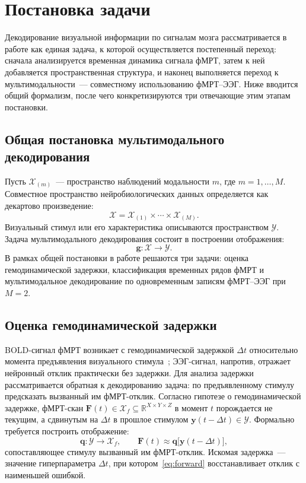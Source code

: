 \section{Постановка задачи}\label{sec2}

Декодирование визуальной информации по сигналам мозга рассматривается в работе как единая задача, к которой осуществляется постепенный переход: сначала анализируется временная динамика сигнала фМРТ, затем к ней добавляется пространственная структура, и наконец выполняется переход к мультимодальности~--- совместному использованию фМРТ--ЭЭГ. Ниже вводится общий формализм, после чего конкретизируются три отвечающие этим этапам постановки.

\subsection{Общая постановка мультимодального декодирования}\label{sec2:general}

Пусть $\mathcal{X}_{(m)}$~--- пространство наблюдений модальности $m$, где $m = 1, \ldots, M$. Совместное пространство нейробиологических данных определяется как декартово произведение:
\begin{equation}\label{eq:joint_space}
\mathcal{X} = \mathcal{X}_{(1)} \times \cdots \times \mathcal{X}_{(M)}.
\end{equation}
Визуальный стимул или его характеристика описываются пространством $\mathcal{Y}$. Задача мультимодального декодирования состоит в построении отображения:
\begin{equation}\label{eq:decoding}
\mathbf{g}: \mathcal{X} \to \mathcal{Y}.
\end{equation}
В рамках общей постановки в работе решаются три задачи: оценка гемодинамической задержки, классификация временных рядов фМРТ и мультимодальное декодирование по одновременным записям фМРТ--ЭЭГ при $M = 2$.

\subsection{Оценка гемодинамической задержки}\label{sec2:delay}
BOLD-сигнал фМРТ возникает с гемодинамической задержкой $\Delta t$ относительно момента предъявления визуального стимула~\cite{Bandettini1992, Logothetis2003}; ЭЭГ-сигнал, напротив, отражает нейронный отклик практически без задержки. Для анализа задержки рассматривается обратная к декодированию задача: по предъявленному стимулу предсказать вызванный им фМРТ-отклик. Согласно гипотезе о гемодинамической задержке, фМРТ-скан $\mathbf{F}(t) \in \mathcal{X}_f \subseteq \mathbb{R}^{X \times Y \times Z}$ в момент $t$ порождается не текущим, а сдвинутым на $\Delta t$ в прошлое стимулом $\mathbf{y}(t - \Delta t) \in \mathcal{Y}$. Формально требуется построить отображение:
\begin{equation}\label{eq:forward}
\mathbf{q}: \mathcal{Y} \to \mathcal{X}_f, \qquad \mathbf{F}(t) \approx \mathbf{q}\big[\mathbf{y}(t - \Delta t)\big],
\end{equation}
сопоставляющее стимулу вызванный им фМРТ-отклик. Искомая задержка~--- значение гиперпараметра $\Delta t$, при котором~\eqref{eq:forward} восстанавливает отклик с наименьшей ошибкой.

